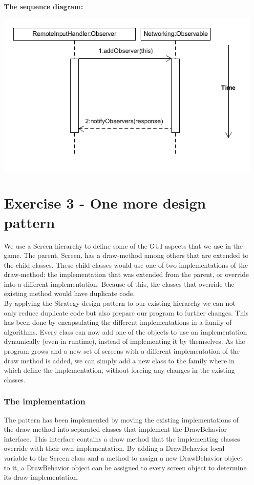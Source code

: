 \documentclass[a4paper,11pt,report]{scrartcl}
\begin{document}
\textbf{The sequence diagram:}\\
\centerline{\includegraphics[scale=1.0]{sources/ObserverSequence}}

\newpage\section{Exercise 3 - One more design pattern}
We use a Screen hierarchy to define some of the GUI aspects that we use in the
game. The parent, Screen, has a draw-method among others that are extended
to the child classes. These child classes would use one of two implementations
of the draw-method: the implementation that was extended from the parent, or
override into a different implementation. Because of this, the classes that
override the existing method would have duplicate code.\\

By applying the Strategy design pattern to our existing hierarchy we can not
only reduce duplicate code but also prepare our program to further changes.
This has been done by encapsulating the different implementations in a family
of algorithms. Every class can now add one of the objects to use an implementation
dynamically (even in runtime), instead of implementing it by themselves. As
the program grows and a new set of screens with a different implementation
of the draw method is added, we can simply add a new class to the family where
in which define the implementation, without forcing any changes in the existing
classes.

\subsubsection{The implementation}
The pattern has been implemented by moving the existing implementations of the
draw method into separated classes that implement the DrawBehavior interface.
This interface contains a draw method that the implementing classes override
with their own implementation. By adding a DrawBehavior local variable to the
Screen class and a method to assign a new DrawBehavior object to it, a
DrawBehavior object can be assigned to every screen object to determine its
draw-implementation.
\end{document}
